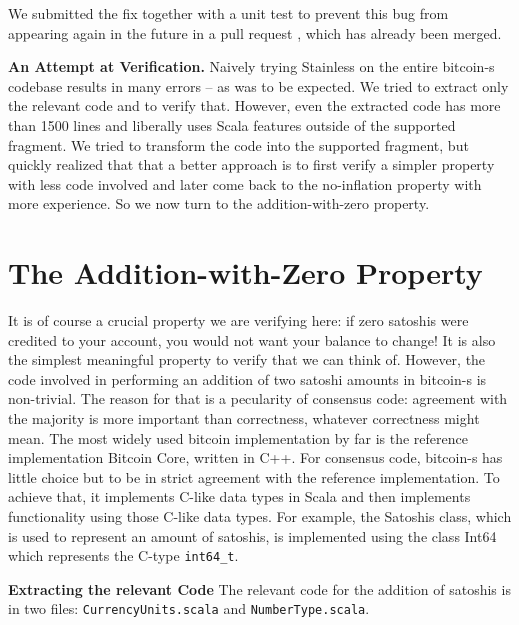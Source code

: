 \documentclass[runningheads]{llncs}
\renewcommand{\paragraph}{\textbf}%
\begin{document}
We submitted the fix together with a unit test to prevent this bug
from appearing again in the future in a pull request
\cite{BitcoinS:pull435}, which has already been merged.


\paragraph{An Attempt at Verification.} Naively trying Stainless on
the entire bitcoin-s codebase results in many errors -- as was to be
expected. We tried to extract only the relevant code and to verify
that. However, even the extracted code has more than 1500 lines and
liberally uses Scala features outside of the supported fragment.  We
tried to transform the code into the supported fragment, but quickly
realized that that a better approach is to first verify a simpler
property with less code involved and later come back to the
no-inflation property with more experience. So we now turn to the
addition-with-zero property.




\section{The Addition-with-Zero Property}

It is of course a crucial property we are verifying here: if zero
satoshis were credited to your account, you would not want your
balance to change! It is also the simplest meaningful property to
verify that we can think of. However, the code involved in performing
an addition of two satoshi amounts in bitcoin-s is non-trivial. The
reason for that is a pecularity of consensus code: agreement with the
majority is more important than correctness, whatever correctness
might mean. The most widely used bitcoin implementation by far is the
reference implementation Bitcoin Core, written in C++. For consensus
code, bitcoin-s has little choice but to be in strict agreement with
the reference implementation. To achieve that, it implements C-like
data types in Scala and then implements functionality using those
C-like data types. For example, the Satoshis class, which is used to
represent an amount of satoshis, is implemented using the class Int64
which represents the C-type \texttt{int64\_t}.

\paragraph{Extracting the relevant Code} The relevant code for the
addition of satoshis is in two files: \texttt{CurrencyUnits.scala} and
\texttt{NumberType.scala}.
\end{document}
